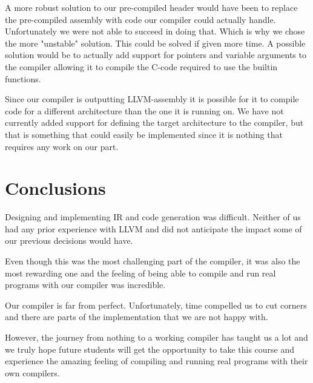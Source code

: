 A more robust solution to our pre-compiled header would have been to replace the pre-compiled assembly with code our compiler could actually handle. Unfortunately we were not able to succeed in doing that. Which is why we chose the more "unstable" solution. This could be solved if given more time. A possible solution would be to actually add support for pointers and variable arguments to the compiler allowing it to compile the C-code required to use the builtin functions.


Since our compiler is outputting LLVM-assembly it is possible for it to compile code for a different architecture than the one it is running on. We have not currently added support for defining the target architecture to the compiler, but that is something that could easily be implemented since it is nothing that requires any work on our part.

\section{Conclusions}

Designing and implementing IR and code generation was difficult. Neither of us had any prior experience with LLVM and did not anticipate the impact some of our previous decisions would have.

Even though this was the most challenging part of the compiler, it was also the most rewarding one and the feeling of being able to compile and run real programs with our compiler was incredible.

Our compiler is far from perfect. Unfortunately, time compelled us to cut corners and there are parts of the implementation that we are not happy with.

However, the journey from nothing to a working compiler has taught us a lot and we truly hope future students will get the opportunity to take this course and experience the amazing feeling of compiling and running real programs with their own compilers.

